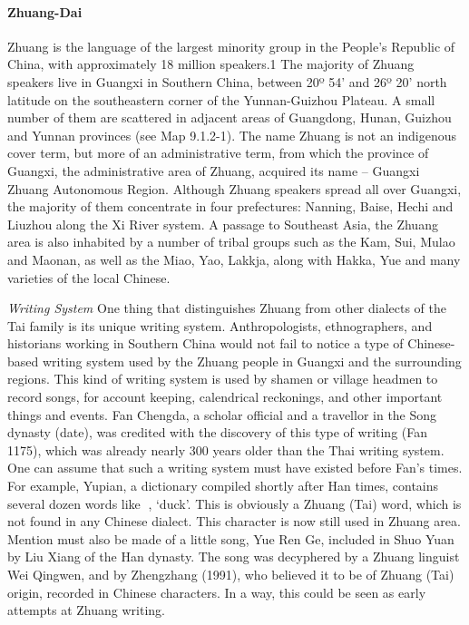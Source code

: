 \paragraph{Zhuang-Dai}
Zhuang is the language of the largest minority group in the People’s Republic of China,
with approximately 18 million speakers.1 The majority of Zhuang speakers live in
Guangxi in Southern China, between 20º 54’ and 26º 20’ north latitude on the
southeastern corner of the Yunnan-Guizhou Plateau. A small number of them are
scattered in adjacent areas of Guangdong, Hunan, Guizhou and Yunnan provinces (see
Map 9.1.2-1). The name Zhuang is not an indigenous cover term, but more of an
administrative term, from which the province of Guangxi, the administrative area of
Zhuang, acquired its name – Guangxi Zhuang Autonomous Region. Although Zhuang
speakers spread all over Guangxi, the majority of them concentrate in four prefectures:
Nanning, Baise, Hechi and Liuzhou along the Xi River system. A passage to Southeast
Asia, the Zhuang area is also inhabited by a number of tribal groups such as the Kam, Sui,
Mulao and Maonan, as well as the Miao, Yao, Lakkja, along with Hakka, Yue and many
varieties of the local Chinese.

\textit{Writing System} One thing that distinguishes Zhuang from other dialects of the Tai family is its unique
writing system. Anthropologists, ethnographers, and historians working in Southern China
would not fail to notice a type of Chinese-based writing system used by the Zhuang people
in Guangxi and the surrounding regions. This kind of writing system is used by shamen or
village headmen to record songs, for account keeping, calendrical reckonings, and other
important things and events. Fan Chengda, a scholar official and a travellor in the Song
dynasty (date), was credited with the discovery of this type of writing (Fan 1175), which
was already nearly 300 years older than the Thai writing system. One can assume that such
a writing system must have existed before Fan’s times. For example, Yupian, a dictionary
compiled shortly after Han times, contains several dozen words like 􅋘, ‘duck’. This is
obviously a Zhuang (Tai) word, which is not found in any Chinese dialect. This character is
now still used in Zhuang area. Mention must also be made of a little song, Yue Ren Ge,
included in Shuo Yuan by Liu Xiang of the Han dynasty. The song was decyphered by a
Zhuang linguist Wei Qingwen, and by Zhengzhang (1991), who believed it to be of Zhuang
(Tai) origin, recorded in Chinese characters. In a way, this could be seen as early attempts at
Zhuang writing.

